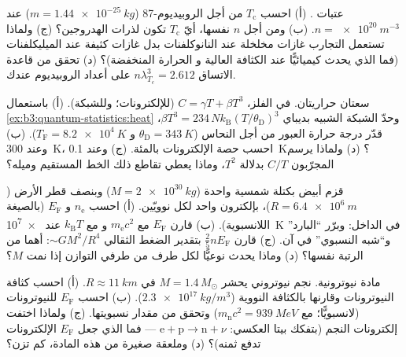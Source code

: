 \begin{exercise}[$\star$]\label{exo:b3:quantum-statistics:4}
عتبات . (أ) احسب $T_{\text{c}}$ من أجل الروبيديوم-87 ($m =
\qty{1.44e-25}{kg}$) عند $n = \qty{e20}{m^{-3}}$. (ب) ومن أجل
$n$ نفسها، أيّ $T_{\text{c}}$ تكون لذرات الهدروجين؟ (ج) ولماذا
تستعمل التجارب غازات مخلخلة عند النانوكلفنات بدل غازات
كثيفة عند الميليكلفنات (فما الذي يحدث كيميائيًّا عند الكثافة العالية و
الحرارة المنخفضة)؟ (د) تحقق من قاعدة الاتساق $n\lambda_{T_c}^3
= 2.612$ على أعداد الروبيديوم عندك.
\end{exercise}

\begin{exercise}[$\star\star$]\label{exo:b3:quantum-statistics:5}
سعتان حراريتان. في الفلز، $C = \gamma T +
\beta T^3$ (للإلكترونات؛ وللشبكة). (أ) باستعمال
\cref{ex:b3:quantum-statistics:heat} وحدّ الشبكة الشبيه
بديباي $\beta T^3 = 234\,Nk_{\text{B}}(T/\theta_{\text{D}})^3$،
قدّر درجة حرارة العبور من أجل النحاس
($\theta_{\text{D}} = \qty{343}{K}$ و $T_{\text{F}} =
\qty{8.2e4}{K}$). (ب) وعند \qty{300}{K}، احسب حصة الإلكترونات
بالمئة. (ج) وعند \qty{0.1}{K}؟ (د) ولماذا يرسم المجرّبون $C/T$
بدلالة $T^2$، وماذا يعطي تقاطع ذلك الخط المستقيم وميله؟
\end{exercise}

\begin{exercise}[$\star\star$]\label{exo:b3:quantum-statistics:6}
قزم أبيض بكتلة شمسية واحدة ($M = \qty{2e30}{kg}$) وبنصف قطر
الأرض ($R = \qty{6.4e6}{m}$)، بإلكترون واحد لكل نوويّين. (أ)
احسب $n_{\text{e}}$ و $E_{\text{F}}$ (بالصيغة
اللانسبوية). (ب) قارن $E_{\text{F}}$ مع $m_{\text{e}}c^2$ و
مع $k_{\text{B}}T$ عند \qty{e7}{K} في الداخل: وبرّر
``البارد'' و``شبه النسبوي'' في آن. (ج) قارن
 $\tfrac25 nE_{\text{F}}$ بتقدير الضغط
الثقالي $\sim GM^2/R^4$: أهما من الرتبة نفسها؟ (د) وماذا يحدث نوعيًّا
لكل طرف من طرفي التوازن إذا نمت $M$؟
\end{exercise}

\begin{exercise}[$\star\star$]\label{exo:b3:quantum-statistics:7}
مادة نيوترونية. نجم نيوتروني يحشر $M = 1.4\,M_\odot$ في $R
\approx \qty{11}{km}$. (أ) احسب كثافة النيوترونات وقارنها
بالكثافة النووية ($\qty{2.3e17}{kg/m^3}$). (ب) احسب
$E_{\text{F}}$ للنيوترونات (لانسبويًّا؛ مع $m_{\text{n}}c^2
= \qty{939}{MeV}$) وتحقق من مقدار نسبويتها. (ج) ولماذا
اختفت إلكترونات النجم (بتفكك بيتا العكسي:
$\text{e} + \text{p} \to \text{n} + \nu$ --- فما الذي جعل
$E_{\text{F}}$ الإلكترونات تدفع ثمنه)؟ (د) وملعقة صغيرة من هذه
المادة، كم تزن؟
\end{exercise}

